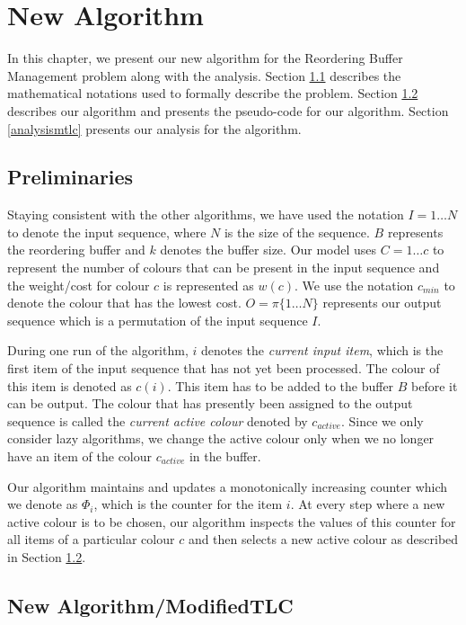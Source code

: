 \chapter{New Algorithm}

In this chapter, we present our new algorithm for the Reordering Buffer Management problem along with the analysis. Section \ref{newPreliminaries} describes the mathematical notations used to formally describe the problem. Section \ref{modifiedtlc} describes our algorithm and presents the pseudo-code for our algorithm. Section \ref{analysismtlc} presents our analysis for the algorithm. 

\section{Preliminaries} \label{newPreliminaries}

Staying consistent with the other algorithms, we have used the notation $I = 1 \ldots N$ to denote the input sequence, where $N$ is the size of the sequence. $B$ represents the reordering buffer and $k$ denotes the buffer size. Our model uses $C = 1 \ldots c$ to represent the number of colours that can be present in the input sequence and the weight/cost for colour $c$ is represented as $w(c)$. We use the notation $c_{min}$ to denote the colour that has the lowest cost. $O = \pi\{1 \ldots N\}$ represents our output sequence which is a permutation of the input sequence $I$. 

During one run of the algorithm, $i$ denotes the \textit{current input item}, which is the first item of the input sequence that has not yet been processed. The colour of this item is denoted as $c(i)$. This item has to be added to the buffer $B$ before it can be output. The colour that has presently been assigned to the output sequence is called the \textit{current active colour} denoted by $c_{active}$. Since we only consider lazy algorithms, we change the active colour only when we no longer have an item of the colour $c_{active}$ in the buffer. 

Our algorithm maintains and updates a monotonically increasing counter which we denote as $\Phi_i$, which is the counter for the item $i$. At every step where a new active colour is to be chosen, our algorithm inspects the values of this counter for all items of a particular colour $c$ and then selects a new active colour as described in Section \ref{modifiedtlc}.

\section{New Algorithm/ModifiedTLC} \label{modifiedtlc}

